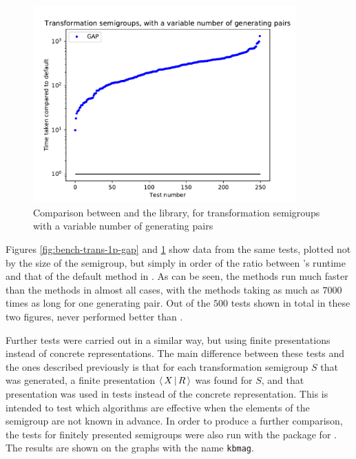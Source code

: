 \begin{figure}[p]
  \centering
  \includegraphics[width=0.9\textwidth]{pics/ch-pairs/bench-trans-vp-gap}
  \caption[Benchmark: \GAP{}/\libsemigroups{}, concrete, $n$ pairs]
  {Comparison between \libsemigroups{} and the \GAP{} library, for
    transformation semigroups with a variable number of generating pairs}
  \label{fig:bench-trans-vp-gap}
\end{figure}

Figures \ref{fig:bench-trans-1p-gap} and \ref{fig:bench-trans-vp-gap} show data
from the same tests, plotted not by
the size of the semigroup, but simply in order of the ratio between \GAP{}'s
runtime and that of the default method in \libsemigroups{}.  As can be
seen, the \libsemigroups{} methods run much faster than the \GAP{} methods in
almost all cases, with the \GAP{} methods taking as much as $7000$ times as long
for one generating pair.  Out of the $500$ tests shown in total in these two
figures, \GAP{} never performed better than \libsemigroups{}.

Further tests were carried out in a similar way, but using finite presentations
instead of concrete representations.  The main difference between these
tests and the ones described previously is that for each transformation
semigroup $S$ that was generated, a finite presentation $\left\langle \, X \, \middle| \, R \, \right\rangle$ was found
for $S$, and that presentation was used in tests instead of the concrete
representation.  This is intended to test which algorithms are effective
when the elements of the semigroup are not known in advance.
In order to produce a further comparison, the tests for finitely presented
semigroups were also run with the \kbmag{} package for \GAP{} \cite{kbmag}.
The results are shown on the graphs with the name \texttt{kbmag}.

